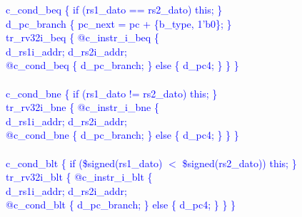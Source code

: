 \textcolor{blue}{
\indent c\_cond\_beq \{ if (rs1\_dato == rs2\_dato) this; \}\\%
\indent d\_pc\_branch \{ pc\_next = pc + \{b\_type, 1'b0\}; \}\\%
\indent tr\_rv32i\_beq \{ @c\_instr\_i\_beq \{ \\%
\indent \hspace{\parindent} d\_rs1i\_addr; d\_rs2i\_addr; \\%
\indent \hspace{\parindent} @c\_cond\_beq \{ d\_pc\_branch; \}  else \{ d\_pc4; \} \} \} \\%
\\
\indent c\_cond\_bne \{ if (rs1\_dato != rs2\_dato) this; \}\\%
\indent tr\_rv32i\_bne \{ @c\_instr\_i\_bne \{ \\%
\indent \hspace{\parindent} d\_rs1i\_addr; d\_rs2i\_addr; \\%
\indent \hspace{\parindent} @c\_cond\_bne \{ d\_pc\_branch; \}  else \{ d\_pc4; \} \} \} \\%
\\
\indent c\_cond\_blt \{ if (\$signed(rs1\_dato) $<$ \$signed(rs2\_dato)) this; \}\\%
\indent tr\_rv32i\_blt \{ @c\_instr\_i\_blt \{ \\%
\indent \hspace{\parindent} d\_rs1i\_addr; d\_rs2i\_addr; \\%
\indent \hspace{\parindent} @c\_cond\_blt \{ d\_pc\_branch; \}  else \{ d\_pc4; \} \} \} \\%
\\
}
